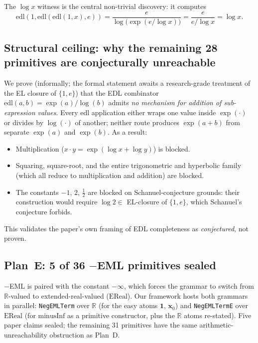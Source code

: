 \documentclass[11pt,a4paper]{article}
\newcommand{\edl}{\mathrm{edl}}
\theoremstyle{plain}
\theoremstyle{definition}
\begin{document}
The $\log x$ witness is the central non-trivial discovery: it computes
\begin{equation}
    \edl(1, \edl(\edl(1, x), e)) =
    \frac{e}{\log\bigl(\exp(e/\log x)\bigr)} =
    \frac{e}{e/\log x} = \log x.
\end{equation}

\subsection{Structural ceiling: why the remaining 28 primitives are conjecturally unreachable}

We prove (informally; the formal statement awaits a research-grade
treatment of the EL closure of $\{1, e\}$) that the EDL combinator
$\edl(a, b) = \exp(a)/\log(b)$ admits \emph{no mechanism for addition
of sub-expression values}. Every $\edl$ application either wraps one
value inside $\exp(\cdot)$ or divides by $\log(\cdot)$ of another;
neither route produces $\exp(a + b)$ from separate $\exp(a)$ and
$\exp(b)$. As a result:

\begin{itemize}[topsep=2pt, itemsep=2pt]
\item Multiplication ($x \cdot y = \exp(\log x + \log y)$) is blocked.
\item Squaring, square-root, and the entire trigonometric and
  hyperbolic family (which all reduce to multiplication and addition)
  are blocked.
\item The constants $-1$, $2$, $\tfrac{1}{2}$ are blocked on
  Schanuel-conjecture grounds: their construction would require
  $\log 2 \in$ EL-closure of $\{1, e\}$, which Schanuel's conjecture
  forbids.
\end{itemize}

This validates the paper's own framing of EDL completeness as
\emph{conjectured}, not proven.

\subsection{\texorpdfstring{Plan~E: 5 of 36 $-\!$EML}{Plan E: 5 of 36 −EML} primitives sealed}

$-\!$EML is paired with the constant $-\infty$, which forces the
grammar to switch from $\mathbb{R}$-valued to extended-real-valued
($\mathrm{EReal}$). Our framework hosts both grammars in parallel:
\texttt{NegEMLTerm} over $\mathbb{R}$ (for the easy atoms $\mathbf{1}$,
$\mathbf{x}_0$) and \texttt{NegEMLTermE} over $\mathrm{EReal}$ (for
$\mathrm{minusInf}$ as a primitive constructor, plus the $\mathbb{R}$
atoms re-stated). Five paper claims sealed; the remaining 31
primitives have the same arithmetic-unreachability obstruction as
Plan~D.
\end{document}
